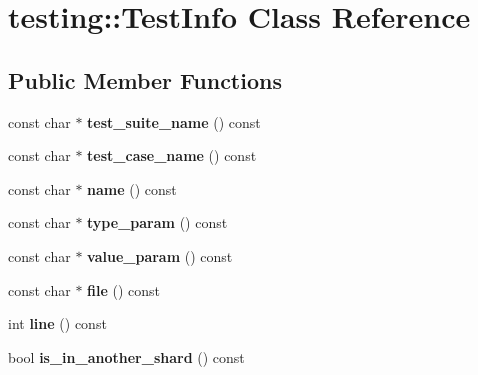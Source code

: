 \hypertarget{classtesting_1_1TestInfo}{}\section{testing\+:\+:Test\+Info Class Reference}
\label{classtesting_1_1TestInfo}
\subsection*{Public Member Functions}
\begin{DoxyCompactItemize}
\item 
\mbox{\label{classtesting_1_1TestInfo_a82a84ffd0e4d18eb5a3f97a2077e12cc}} 
const char $\ast$ {\bfseries test\+\_\+suite\+\_\+name} () const
\item 
\mbox{\label{classtesting_1_1TestInfo_a036a20710c8c2252889544daba9a8ff9}} 
const char $\ast$ {\bfseries test\+\_\+case\+\_\+name} () const
\item 
\mbox{\label{classtesting_1_1TestInfo_ac2581b45eccc9a3b94cb41c4807d0e34}} 
const char $\ast$ {\bfseries name} () const
\item 
\mbox{\label{classtesting_1_1TestInfo_a7759bc57f4350ad406cbbb0b3bcea320}} 
const char $\ast$ {\bfseries type\+\_\+param} () const
\item 
\mbox{\label{classtesting_1_1TestInfo_abdf2c6cfcf4819e725816c64e1c1fc24}} 
const char $\ast$ {\bfseries value\+\_\+param} () const
\item 
\mbox{\label{classtesting_1_1TestInfo_a9b74d79cf618ce5bb0d0b1da75ee8b35}} 
const char $\ast$ {\bfseries file} () const
\item 
\mbox{\label{classtesting_1_1TestInfo_af5931cfc594b5d660c56b3c61c41ea13}} 
int {\bfseries line} () const
\item 
\mbox{\label{classtesting_1_1TestInfo_a8621f2cf7623fd1609db8e324f0c2fec}} 
bool {\bfseries is\+\_\+in\+\_\+another\+\_\+shard} () const
\item 

\end{DoxyCompactItemize}
